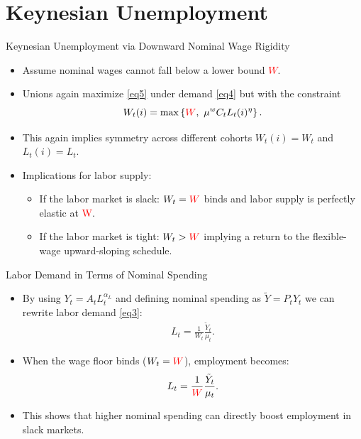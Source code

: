\documentclass[11pt,aspectratio=169]{beamer}
\begin{document}
\section{Keynesian Unemployment}
\label{SectionKU}

\begin{frame}{Keynesian Unemployment via Downward Nominal Wage Rigidity}
\begin{itemize}
    \item Assume nominal wages cannot fall below a lower bound \textcolor{red}{$W$}. 
    \item Unions again maximize \eqref{eq5} under demand \eqref{eq4} but with the constraint 
\[
W_t(i)=\max\left\{\textcolor{red}{W},\ \mu^w C_t L_t(i)^\eta \right\}.
\]    \item This again implies symmetry across different cohorts $W_t(i)=W_t$ and $L_t(i)=L_t$.
    \item Implications for labor supply: 
    \begin{itemize}
        \item If the labor market is slack: $W_t=\textcolor{red}{W}$ binds and labor supply is perfectly elastic at \textcolor{red}{W}.
        \item If the labor market is tight: $W_t>\textcolor{red}{W}$ implying a return to the flexible-wage upward-sloping schedule.
    \end{itemize}
\end{itemize}
\end{frame}



\begin{frame}{Labor Demand in Terms of Nominal Spending}
\begin{itemize}
    \item By using $Y_t = A_tL_t^{\alpha_L}$ and defining nominal spending as $\tilde{Y} = P_tY_t$ we can rewrite labor demand \eqref{eq3}: 
    \begin{align*}
        L_t=\frac{1}{W_t}\frac{\tilde{Y}_t}{\mu_t}.
    \end{align*}
    \item When the wage floor binds ($W_t=\textcolor{red}{W}$), employment becomes:
\[
L_t=\frac{1}{\textcolor{red}{W}}\frac{\tilde{Y}_t}{\mu_t}.
\]
    \item This shows that higher nominal spending can directly boost employment in slack markets. 
\end{itemize}
\end{frame}
\end{document}

